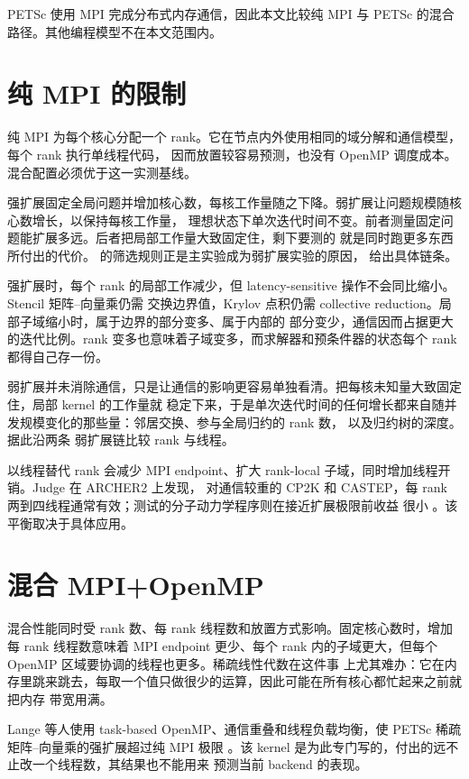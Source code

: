 \documentclass[11pt,a4paper,oneside]{report}
\begin{document}
PETSc 使用 MPI 完成分布式内存通信，因此本文比较纯 MPI 与 PETSc 的混合路径。其他编程模型不在本文范围内。

\section{纯 MPI 的限制}
\label{sec:flatmpi}
纯 MPI 为每个核心分配一个 rank。它在节点内外使用相同的域分解和通信模型，每个 rank 执行单线程代码，
因而放置较容易预测，也没有 OpenMP 调度成本。混合配置必须优于这一实测基线。

强扩展固定全局问题并增加核心数，每核工作量随之下降。弱扩展让问题规模随核心数增长，以保持每核工作量，
理想状态下单次迭代时间不变。前者测量固定问题能扩展多远。后者把局部工作量大致固定住，剩下要测的
就是同时跑更多东西所付出的代价。 的筛选规则正是主实验成为弱扩展实验的原因，
 给出具体链条。

强扩展时，每个 rank 的局部工作减少，但 latency-sensitive 操作不会同比缩小。Stencil 矩阵--向量乘仍需
交换边界值，Krylov 点积仍需 collective reduction。局部子域缩小时，属于边界的部分变多、属于内部的
部分变少，通信因而占据更大的迭代比例。rank 变多也意味着子域变多，而求解器和预条件器的状态每个 rank
都得自己存一份。

弱扩展并未消除通信，只是让通信的影响更容易单独看清。把每核未知量大致固定住，局部 kernel 的工作量就
稳定下来，于是单次迭代时间的任何增长都来自随并发规模变化的那些量：邻居交换、参与全局归约的 rank 数，
以及归约树的深度。 据此沿两条
弱扩展链比较 rank 与线程。

以线程替代 rank 会减少 MPI endpoint、扩大 rank-local 子域，同时增加线程开销。Judge 在 ARCHER2 上发现，
对通信较重的 CP2K 和 CASTEP，每 rank 两到四线程通常有效；测试的分子动力学程序则在接近扩展极限前收益
很小 \cite{judge2022mpiopenmp}。该平衡取决于具体应用。

\section{混合 MPI+OpenMP}
\label{sec:hybrid}
混合性能同时受 rank 数、每 rank 线程数和放置方式影响。固定核心数时，增加每 rank 线程数意味着 MPI
endpoint 更少、每个 rank 内的子域更大，但每个 OpenMP 区域要协调的线程也更多。稀疏线性代数在这件事
上尤其难办：它在内存里跳来跳去，每取一个值只做很少的运算，因此可能在所有核心都忙起来之前就把内存
带宽用满。

Lange 等人使用 task-based OpenMP、通信重叠和线程负载均衡，使 PETSc 稀疏矩阵--向量乘的强扩展超过纯 MPI
极限 \cite{lange_petsc_hybrid}。该 kernel 是为此专门写的，付出的远不止改一个线程数，其结果也不能用来
预测当前 backend 的表现。
\end{document}
